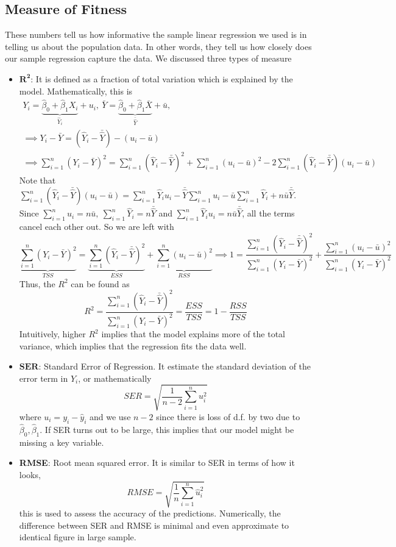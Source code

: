 \documentclass[12pt]{article}
\theoremstyle{definition}
\theoremstyle{property}
\theoremstyle{assumption}
\theoremstyle{example}
\theoremstyle{comment}
\begin{document}
\subsection{Measure of Fitness}
These numbers tell us how informative the sample linear regression we used is in telling us about the population data. In other words, they tell us how closely does our sample regression capture the data. We discussed three types of measure
\begin{itemize}
\item $\mathbf{R^2}$: It is defined as a fraction of total variation which is explained by the model. Mathematically, this is
\begin{gather*}
Y_i = \underbrace{\hat{\beta}_0 + \hat{\beta}_1X_i}_{\hat{Y}_i} + u_i, \ \bar{Y} = \underbrace{\hat{\beta}_0 + \hat{\beta}_1\bar{X}}_{\bar{\hat{Y}}} + \bar{u}, \\
\implies Y_i-\bar{Y} = (\hat{Y}_i - \bar{\hat{Y}}) - (u_i - \bar{u}) \\
\implies \sum_{i=1}^n (Y_i-\bar{Y})^2= \sum_{i=1}^n (\hat{Y}_i - \bar{\hat{Y}})^2+\sum_{i=1}^n(u_i - \bar{u})^2 - 2\sum_{i=1}^n(\hat{Y}_i - \bar{\hat{Y}}) (u_i - \bar{u})
\end{gather*}
Note that $\sum_{i=1}^n(\hat{Y}_i - \bar{\hat{Y}}) (u_i - \bar{u})=\sum_{i=1}^n\hat{Y}_i{u}_i-\bar{\hat{Y}}\sum_{i=1}^nu_i -\bar{u}\sum_{i=1}^n\hat{Y}_i +n\bar{u}\bar{\hat{Y}}$. Since $\sum_{i=1}^nu_i = n\bar{u},\ \sum_{i=1}^n\hat{Y}_i = n\bar{\hat{Y}}$ and $\sum_{i=1}^n\hat{Y}_iu_i=n\bar{u}\bar{\hat{Y}}$, all the terms cancel each other out. So we are left with
\[
\underbrace{\sum_{i=1}^n (Y_i-\bar{Y})^2}_{TSS}= \underbrace{\sum_{i=1}^n (\hat{Y}_i - \bar{\hat{Y}})^2}_{ESS}+\underbrace{\sum_{i=1}^n(u_i - \bar{u})^2}_{RSS} \implies 1=\frac{\sum_{i=1}^n (\hat{Y}_i - \bar{\hat{Y}})^2}{\sum_{i=1}^n (Y_i-\bar{Y})^2} + \frac{\sum_{i=1}^n(u_i - \bar{u})^2 }{\sum_{i=1}^n (Y_i-\bar{Y})^2}
\]
Thus, the $R^2$ can be found as
\[
R^2 = \frac{\sum_{i=1}^n (\hat{Y}_i - \bar{\hat{Y}})^2}{\sum_{i=1}^n (Y_i-\bar{Y})^2} = \frac{ESS}{TSS} = 1-\frac{RSS}{TSS}
\]
Intuitively, higher $R^2$ implies that the model explains more of the total variance, which implies that the regression fits the data well. 
\item $\mathbf{SER}$: Standard Error of Regression. It estimate the standard deviation of the error term in $Y_i$, or mathematically
\[
SER = \sqrt{\frac{1}{n-2}\sum_{i=1}^n u_i^2}
\]
where $u_i = y_i-\hat{y}_i$ and we use $n-2$ since there is loss of d.f. by two due to $\hat{\beta}_0, \hat{\beta}_1$. If SER turns out to be large, this implies that our model might be missing a key variable.

 \item \textbf{RMSE}: Root mean squared error. It is similar to SER in terms of how it looks, 
\[
RMSE = \sqrt{\frac{1}{n}\sum_{i=1}^n \hat{u}_i^2}
\]
this is used to assess the accuracy of the predictions. Numerically, the difference between SER and RMSE is minimal and even approximate to identical figure in large sample. 
\end{itemize}
\end{document}
